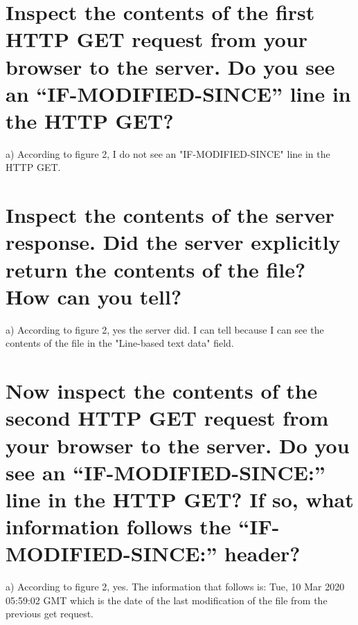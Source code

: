 \documentclass{article}
\begin{document}
\section{Inspect the contents of the first HTTP GET request from your browser to the
server. Do you see an “IF-MODIFIED-SINCE” line in the HTTP GET?}
a)  According to figure 2, I do not see an "IF-MODIFIED-SINCE" line in the HTTP GET.\\
\section{Inspect the contents of the server response. Did the server explicitly return the
contents of the file? How can you tell?}
a)  According to figure 2, yes the server did.  I can tell because I can see the contents of the file in the "Line-based text data" field.\\
\section{Now inspect the contents of the second HTTP GET request from your browser to
the server. Do you see an “IF-MODIFIED-SINCE:” line in the HTTP GET? If
so, what information follows the “IF-MODIFIED-SINCE:” header?}
a)  According to figure 2, yes.  The information that follows is: Tue, 10 Mar 2020 05:59:02 GMT which is the date of the last modification of the file from the previous get request.\\
\end{document}
